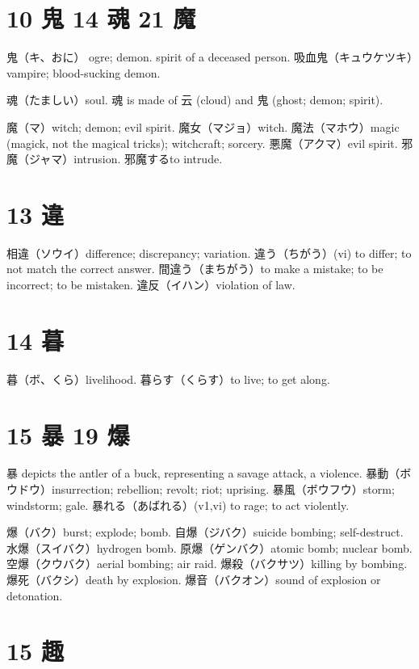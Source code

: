 \section{10 鬼 14 魂 21 魔}

鬼（キ、おに）
ogre; demon.
spirit of a deceased person.
吸血鬼（キュウケツキ）vampire; blood-sucking demon.

魂（たましい）soul.
魂 is made of 云 (cloud) and 鬼 (ghost; demon; spirit).

魔（マ）witch; demon; evil spirit.
魔女（マジョ）witch.
魔法（マホウ）magic (magick, not the magical tricks); witchcraft; sorcery.
悪魔（アクマ）evil spirit.
邪魔（ジャマ）intrusion.
邪魔するto intrude.

\section{13 違}

相違（ソウイ）difference; discrepancy; variation.
違う（ちがう）(vi) to differ; to not match the correct answer.
間違う（まちがう）to make a mistake; to be incorrect; to be mistaken.
違反（イハン）violation of law.

\section{14 暮}

暮（ボ、くら）livelihood.
暮らす（くらす）to live; to get along.

\section{15 暴 19 爆}

暴 depicts the antler of a buck, representing a savage attack, a violence.
暴動（ボウドウ）insurrection; rebellion; revolt; riot; uprising.
暴風（ボウフウ）storm; windstorm; gale.
暴れる（あばれる）(v1,vi) to rage; to act violently.

爆（バク）burst; explode; bomb.
自爆（ジバク）suicide bombing; self-destruct.
水爆（スイバク）hydrogen bomb.
原爆（ゲンバク）atomic bomb; nuclear bomb.
空爆（クウバク）aerial bombing; air raid.
爆殺（バクサツ）killing by bombing.
爆死（バクシ）death by explosion.
爆音（バクオン）sound of explosion or detonation.

\section{15 趣}

